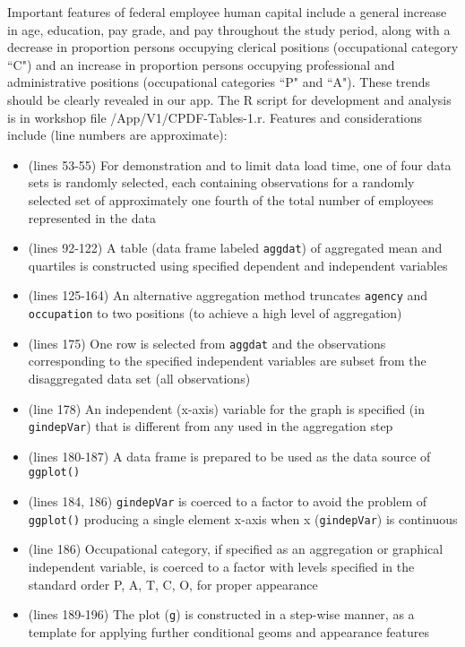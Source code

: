 \documentclass[10pt, letterpaper]{article}
\begin{document}
\begin{spacing}{1.0}
Important features of federal employee human capital include a general increase in age, education, pay grade, and pay throughout the study period, along with a decrease in proportion persons occupying clerical positions (occupational category ``C") and an increase in proportion persons occupying professional and administrative positions (occupational categories ``P" and ``A").  These trends should be clearly revealed in our app. The R script for development and analysis is in workshop file /App/V1/CPDF-Tables-1.r.  Features and considerations include (line numbers are approximate):

\begin{itemize}
    \item (lines 53-55) For demonstration and to limit data load time, one of four data sets is randomly selected, each containing observations for a randomly selected set of approximately one fourth of the total number of employees represented in the data
    \item (lines 92-122) A table (data frame labeled \texttt{aggdat}) of aggregated mean and quartiles is constructed using specified dependent and independent variables
    \item (lines 125-164) An alternative aggregation method truncates \texttt{agency} and \texttt{occupation} to two positions (to achieve a high level of aggregation)
    \item (lines 175) One row is selected from \texttt{aggdat} and the observations corresponding to the specified independent variables are subset from the disaggregated data set (all observations)
    \item (line 178) An independent (x-axis) variable for the graph is specified (in \texttt{gindepVar}) that is different from any used in the aggregation step
    \item (lines 180-187) A data frame is prepared to be used as the data source of \texttt{ggplot()}
    \item (lines 184, 186) \texttt{gindepVar} is coerced to a factor to avoid the problem of \texttt{ggplot()} producing a single element x-axis when x (\texttt{gindepVar}) is continuous
    \item(line 186)  Occupational category, if specified as an aggregation or graphical independent variable, is coerced to a factor with levels specified in the standard order P, A, T, C, O, for proper appearance
    \item (lines 189-196) The plot (\texttt{g}) is constructed in a step-wise manner, as a template for applying further conditional geoms and appearance features

\end{itemize}
\end{spacing}
\end{document}
